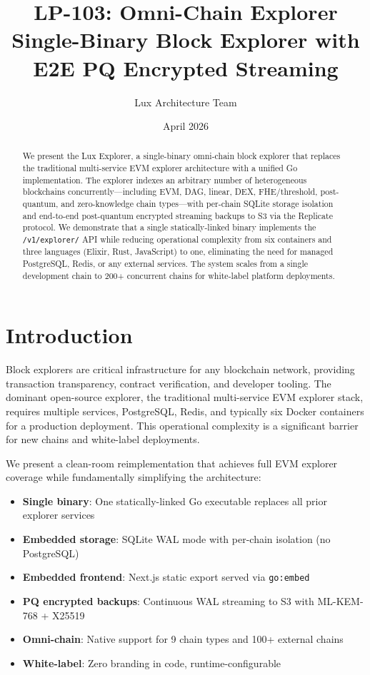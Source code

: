 \documentclass[11pt,a4paper]{article}
\title{LP-103: Omni-Chain Explorer\\Single-Binary Block Explorer with E2E PQ Encrypted Streaming}
\author{Lux Architecture Team}
\date{April 2026}
\begin{document}
\maketitle

\begin{abstract}
We present the Lux Explorer, a single-binary omni-chain block explorer that replaces the
traditional multi-service EVM explorer architecture with a unified Go implementation. The
explorer indexes an arbitrary number of heterogeneous blockchains concurrently---including
EVM, DAG, linear, DEX, FHE/threshold, post-quantum, and zero-knowledge chain types---with
per-chain SQLite storage isolation and end-to-end post-quantum encrypted streaming backups
to S3 via the Replicate protocol. We demonstrate that a single statically-linked binary
implements the \texttt{/v1/explorer/} API while reducing operational complexity from six
containers and three languages (Elixir, Rust, JavaScript) to one, eliminating the need for
managed PostgreSQL, Redis, or any external services. The system scales from a single
development chain to 200+ concurrent chains for white-label platform deployments.
\end{abstract}

\tableofcontents

\section{Introduction}

Block explorers are critical infrastructure for any blockchain network, providing transaction
transparency, contract verification, and developer tooling. The dominant open-source explorer,
the traditional multi-service EVM explorer stack, requires multiple services, PostgreSQL,
Redis, and typically six Docker containers for a production deployment. This operational
complexity is a significant barrier for new chains and white-label deployments.

We present a clean-room reimplementation that achieves full EVM explorer coverage while fundamentally simplifying the architecture:

\begin{itemize}
  \item \textbf{Single binary}: One statically-linked Go executable replaces all prior explorer services
  \item \textbf{Embedded storage}: SQLite WAL mode with per-chain isolation (no PostgreSQL)
  \item \textbf{Embedded frontend}: Next.js static export served via \texttt{go:embed}
  \item \textbf{PQ encrypted backups}: Continuous WAL streaming to S3 with ML-KEM-768 + X25519
  \item \textbf{Omni-chain}: Native support for 9 chain types and 100+ external chains
  \item \textbf{White-label}: Zero branding in code, runtime-configurable
\end{itemize}
\end{document}
